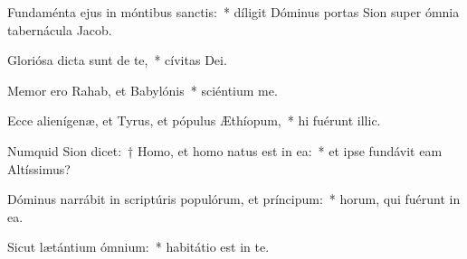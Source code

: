 \item Fundaménta ejus in móntibus sanctis:~* díligit Dóminus portas Sion super ómnia tabernácula Jacob.

\item Gloriósa dicta sunt de te,~* cívitas Dei.

\item Memor ero Rahab, et Babylónis~* sciéntium me.

\item Ecce alienígenæ, et Tyrus, et pópulus Æthíopum,~* hi fuérunt illic.

\item Numquid Sion dicet:~† Homo, et homo natus est in ea:~* et ipse fundávit eam Altíssimus?

\item Dóminus narrábit in scriptúris populórum, et príncipum:~* horum, qui fuérunt in ea.

\item Sicut lætántium ómnium:~* habitátio est in te.
